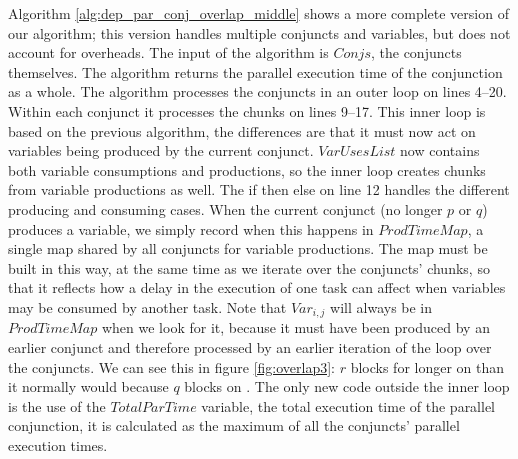 Algorithm \ref{alg:dep_par_conj_overlap_middle} shows a more complete
version of our algorithm;
this version handles multiple conjuncts and variables,
but does not account for overheads.
The input of the algorithm is $Conjs$,
the conjuncts themselves.
The algorithm returns the parallel execution time of the conjunction as a
whole.
The algorithm processes the conjuncts in an outer loop on lines 4--20.
Within each conjunct it processes the chunks on lines 9--17.
This inner loop is based on the previous algorithm,
the differences are that it must now act on variables being produced by the
current conjunct.
$VarUsesList$ now contains both variable consumptions and productions,
so the inner loop creates chunks from variable productions as well.
The if then else on line 12 handles the different producing and consuming
cases.
When the current conjunct (no longer $p$ or $q$)
produces a variable, we simply record when this happens in $ProdTimeMap$,
a single map shared by all conjuncts for variable productions.
The map must be built in this way, at the same time as we iterate over the
conjuncts' chunks,
so that it reflects how a delay in the execution of one task can affect when
variables may be consumed by another task.
Note that $Var_{i, j}$
will always be in $ProdTimeMap$ when we look for it,
because it must have been produced by an earlier conjunct
and therefore processed by an earlier iteration of the loop over the
conjuncts.
We can see this in figure \ref{fig:overlap3}:
$r$ blocks for longer on  than it normally would because $q$ blocks
on .
The only new code outside the inner loop is the use of the $TotalParTime$
variable,
the total execution time of the parallel conjunction,
it is calculated as the maximum of all the conjuncts' parallel execution
times.

%
%

